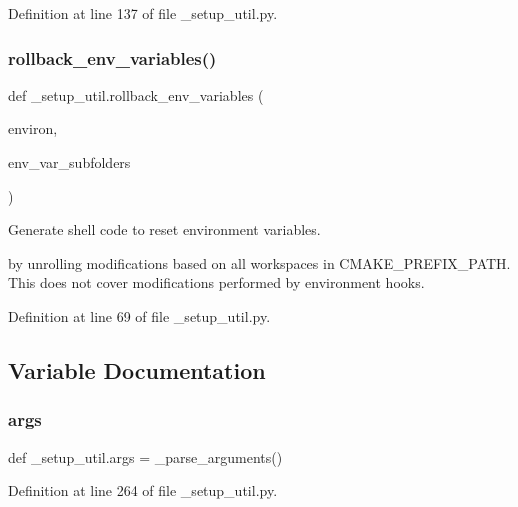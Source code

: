 Definition at line 137 of file \+\_\+setup\+\_\+util.\+py.

\mbox{\label{namespace__setup__util_af3030db6102b5aa35cd354a2fb6cca03}} 
\subsubsection{\texorpdfstring{rollback\+\_\+env\+\_\+variables()}{rollback\_env\_variables()}}
{\footnotesize\ttfamily def \+\_\+setup\+\_\+util.\+rollback\+\_\+env\+\_\+variables (\begin{DoxyParamCaption}\item[{}]{environ,  }\item[{}]{env\+\_\+var\+\_\+subfolders }\end{DoxyParamCaption})}

\begin{DoxyVerb}Generate shell code to reset environment variables.

by unrolling modifications based on all workspaces in CMAKE_PREFIX_PATH.
This does not cover modifications performed by environment hooks.
\end{DoxyVerb}
 

Definition at line 69 of file \+\_\+setup\+\_\+util.\+py.



\subsection{Variable Documentation}
\mbox{\label{namespace__setup__util_a831491331b0650d492585147f04d6615}} 
\subsubsection{\texorpdfstring{args}{args}}
{\footnotesize\ttfamily def \+\_\+setup\+\_\+util.\+args = \+\_\+parse\+\_\+arguments()}



Definition at line 264 of file \+\_\+setup\+\_\+util.\+py.

